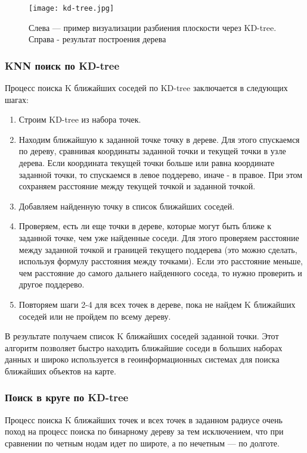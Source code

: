 \begin{figure}[h]
    \centering
    \texttt{[image: kd-tree.jpg]}
    \caption{Слева — пример визуализации разбиения плоскости через KD-tree. Справа - результат построения дерева}
\end{figure}

\subsubsection{KNN поиск по KD-tree}

Процесс поиска K ближайших соседей по KD-tree заключается в следующих шагах:

\begin{enumerate}
    \item Строим KD-tree из набора точек.
    \item Находим ближайшую к заданной точке точку в дереве. Для этого спускаемся по дереву, сравнивая координаты заданной точки и текущей точки в узле дерева. Если координата текущей точки больше или равна координате заданной точки, то спускаемся в левое поддерево, иначе - в правое. При этом сохраняем расстояние между текущей точкой и заданной точкой.
    \item Добавляем найденную точку в список ближайших соседей.
    \item Проверяем, есть ли еще точки в дереве, которые могут быть ближе к заданной точке, чем уже найденные соседи. Для этого проверяем расстояние между заданной точкой и границей текущего поддерева (это можно сделать, используя формулу расстояния между точками). Если это расстояние меньше, чем расстояние до самого дальнего найденного соседа, то нужно проверить и другое поддерево.
    \item Повторяем шаги 2-4 для всех точек в дереве, пока не найдем K ближайших соседей или не пройдем по всему дереву.
\end{enumerate}

В результате получаем список K ближайших соседей заданной точки. Этот алгоритм позволяет быстро находить ближайшие соседи в больших наборах данных и широко используется в геоинформационных системах для поиска ближайших объектов на карте.

\subsubsection{Поиск в круге по KD-tree}
Процесс поиска K ближайших точек и всех точек в заданном радиусе очень поход на процесс поиска по бинарному дереву за тем исключением, что при сравнении по четным нодам идет по широте, а по нечетным — по долготе.

